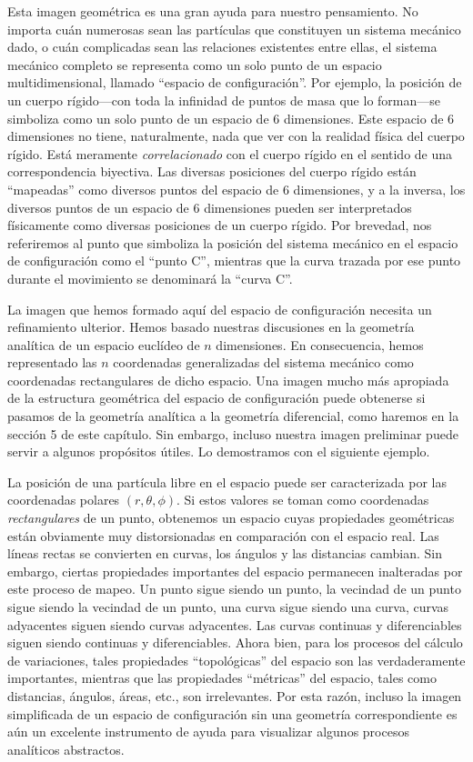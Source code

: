 \documentclass[12pt,a4paper]{book}
\begin{document}
Esta imagen geom\'etrica es una gran ayuda para nuestro pensamiento. No importa cu\'an numerosas sean las part\'iculas que constituyen un sistema mec\'anico dado, o cu\'an complicadas sean las relaciones existentes entre ellas, el sistema mec\'anico completo se representa como un solo punto de un espacio multidimensional, llamado ``espacio de configuraci\'on''. Por ejemplo, la posici\'on de un cuerpo r\'igido---con toda la infinidad de puntos de masa que lo forman---se simboliza como un solo punto de un espacio de 6 dimensiones. Este espacio de 6 dimensiones no tiene, naturalmente, nada que ver con la realidad f\'isica del cuerpo r\'igido. Est\'a meramente \textit{correlacionado} con el cuerpo r\'igido en el sentido de una correspondencia biyectiva. Las diversas posiciones del cuerpo r\'igido est\'an ``mapeadas'' como diversos puntos del espacio de 6 dimensiones, y a la inversa, los diversos puntos de un espacio de 6 dimensiones pueden ser interpretados f\'isicamente como diversas posiciones de un cuerpo r\'igido. Por brevedad, nos referiremos al punto que simboliza la posici\'on del sistema mec\'anico en el espacio de configuraci\'on como el ``punto C'', mientras que la curva trazada por ese punto durante el movimiento se denominar\'a la ``curva C''.

La imagen que hemos formado aqu\'i del espacio de configuraci\'on necesita un refinamiento ulterior. Hemos basado nuestras discusiones en la geometr\'ia anal\'itica de un espacio eucl\'ideo de $n$ dimensiones. En consecuencia, hemos representado las $n$ coordenadas generalizadas del sistema mec\'anico como coordenadas rectangulares de dicho espacio. Una imagen mucho m\'as apropiada de la estructura geom\'etrica del espacio de configuraci\'on puede obtenerse si pasamos de la geometr\'ia anal\'itica a la geometr\'ia diferencial, como haremos en la secci\'on 5 de este cap\'itulo. Sin embargo, incluso nuestra imagen preliminar puede servir a algunos prop\'ositos \'utiles. Lo demostramos con el siguiente ejemplo.

La posici\'on de una part\'icula libre en el espacio puede ser caracterizada por las coordenadas polares $(r, \theta, \phi)$. Si estos valores se toman como coordenadas \textit{rectangulares} de un punto, obtenemos un espacio cuyas propiedades geom\'etricas est\'an obviamente muy distorsionadas en comparaci\'on con el espacio real. Las l\'ineas rectas se convierten en curvas, los \'angulos y las distancias cambian. Sin embargo, ciertas propiedades importantes del espacio permanecen inalteradas por este proceso de mapeo. Un punto sigue siendo un punto, la vecindad de un punto sigue siendo la vecindad de un punto, una curva sigue siendo una curva, curvas adyacentes siguen siendo curvas adyacentes. Las curvas continuas y diferenciables siguen siendo continuas y diferenciables. Ahora bien, para los procesos del c\'alculo de variaciones, tales propiedades ``topol\'ogicas'' del espacio son las verdaderamente importantes, mientras que las propiedades ``m\'etricas'' del espacio, tales como distancias, \'angulos, \'areas, etc., son irrelevantes. Por esta raz\'on, incluso la imagen simplificada de un espacio de configuraci\'on sin una geometr\'ia correspondiente es a\'un un excelente instrumento de ayuda para visualizar algunos procesos anal\'iticos abstractos.
\end{document}
